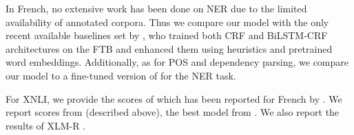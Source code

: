 
In French, no extensive work has been done on NER due to the limited availability of annotated corpora. Thus we compare our model with the only recent available baselines set by \citet{dupont2018exploration}, who trained both CRF \citep{lafferty2001conditional} and BiLSTM-CRF \citep{lample2016neural} architectures on the FTB and enhanced them using heuristics and pretrained word embeddings. Additionally, as for POS and dependency parsing, we compare our model to a fine-tuned version of \mbert for the NER task.

For XNLI, we provide the scores of \mbert which has been reported for French by \citet{wu2019beto}.
We report scores from \xlmmlmtlm (described above), the best model from \citet{conneau-lample-2019-cross}. %
We also report the results of \mbox{XLM-R} \cite{conneau-etal-2020-unsupervised}.



